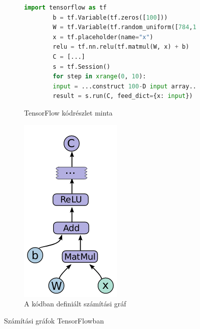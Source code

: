\begin{figure}[h]
	\begin{subfigure}{0.7\textwidth}
		\begin{lstlisting}[language=Python]
		import tensorflow as tf
		b = tf.Variable(tf.zeros([100]))
		W = tf.Variable(tf.random_uniform([784,100],-1,1))
		x = tf.placeholder(name="x")
		relu = tf.nn.relu(tf.matmul(W, x) + b)
		C = [...]
		s = tf.Session()
		for step in xrange(0, 10):
		input = ...construct 100-D input array...
		result = s.run(C, feed_dict={x: input})
		\end{lstlisting}\label{lst:TF}
		\caption{TensorFlow kódrészlet minta}
	\end{subfigure}
	\begin{subfigure}{0.25\textwidth}
		\centering
		\includegraphics[width=0.9\columnwidth]{fig/TF_CompGraph}
		\caption{A kódban definiált számítási gráf}
		\label{fig:tfcompgraph}
	\end{subfigure}
	\caption{Számítási gráfok TensorFlowban}
\end{figure}

